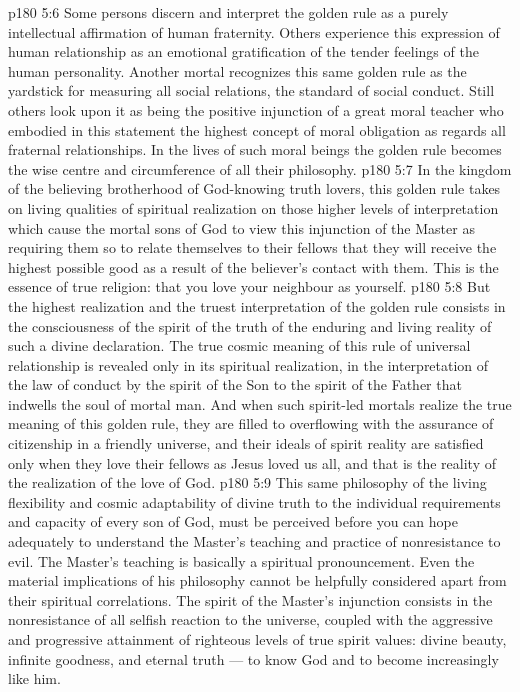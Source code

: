 \vs p180 5:6 Some persons discern and interpret the golden rule as a purely intellectual affirmation of human fraternity. Others experience this expression of human relationship as an emotional gratification of the tender feelings of the human personality. Another mortal recognizes this same golden rule as the yardstick for measuring all social relations, the standard of social conduct. Still others look upon it as being the positive injunction of a great moral teacher who embodied in this statement the highest concept of moral obligation as regards all fraternal relationships. In the lives of such moral beings the golden rule becomes the wise centre and circumference of all their philosophy.
\vs p180 5:7 In the kingdom of the believing brotherhood of God\hyp{}knowing truth lovers, this golden rule takes on living qualities of spiritual realization on those higher levels of interpretation which cause the mortal sons of God to view this injunction of the Master as requiring them so to relate themselves to their fellows that they will receive the highest possible good as a result of the believer’s contact with them. This is the essence of true religion: that you love your neighbour as yourself.
\vs p180 5:8 But the highest realization and the truest interpretation of the golden rule consists in the consciousness of the spirit of the truth of the enduring and living reality of such a divine declaration. The true cosmic meaning of this rule of universal relationship is revealed only in its spiritual realization, in the interpretation of the law of conduct by the spirit of the Son to the spirit of the Father that indwells the soul of mortal man. And when such spirit\hyp{}led mortals realize the true meaning of this golden rule, they are filled to overflowing with the assurance of citizenship in a friendly universe, and their ideals of spirit reality are satisfied only when they love their fellows as Jesus loved us all, and that is the reality of the realization of the love of God.
\vs p180 5:9 This same philosophy of the living flexibility and cosmic adaptability of divine truth to the individual requirements and capacity of every son of God, must be perceived before you can hope adequately to understand the Master’s teaching and practice of nonresistance to evil. The Master’s teaching is basically a spiritual pronouncement. Even the material implications of his philosophy cannot be helpfully considered apart from their spiritual correlations. The spirit of the Master’s injunction consists in the nonresistance of all selfish reaction to the universe, coupled with the aggressive and progressive attainment of righteous levels of true spirit values: divine beauty, infinite goodness, and eternal truth --- to know God and to become increasingly like him.
